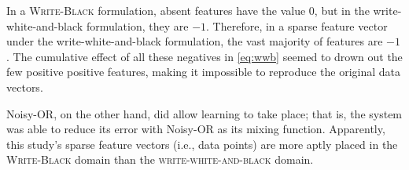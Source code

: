 In a \textsc{Write-Black} formulation, absent features have the value $0$, but in the write-white-and-black formulation, they are $-1$. Therefore, in a sparse feature vector under the write-white-and-black formulation, the vast majority of features are $-1$. The cumulative effect of all these negatives in \eqref{eq:wwb} seemed to drown out the few positive positive features, making it impossible to reproduce the original data vectors. 

Noisy-OR, on the other hand, did allow learning to take place; that is, 
the system was able to reduce its error with Noisy-OR as its mixing function. 
Apparently, this study's sparse feature vectors (i.e., data points) are more aptly 
placed in the \textsc{Write-Black} domain than the \textsc{write-white-and-black} domain.



